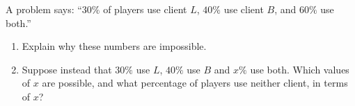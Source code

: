 A problem says: ``$30\%$ of players use client $L$, $40\%$ use client $B$, and $60\%$ use both.''
\begin{enumerate}
\item[(a)] Explain why these numbers are impossible.
\item[(b)] Suppose instead that $30\%$ use $L$, $40\%$ use $B$ and $x\%$ use both. Which values of $x$ are possible, and what percentage of players use neither client, in terms of $x$?
\end{enumerate}
